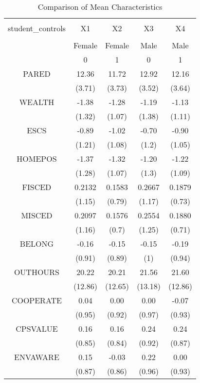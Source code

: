 
\begin{table}[!htbp] \centering 
  \caption{Comparison of Mean Characteristics} 
  \label{Tab1} 
\scriptsize 
\begin{tabular}{@{\extracolsep{5pt}} ccccc} 
\\[-1.8ex]\hline 
\hline \\[-1.8ex] 
student\_controls & X1 & X2 & X3 & X4 \\ 
\hline \\[-1.8ex] 
 & Female & Female & Male & Male \\ 
 & 0 & 1 & 0 & 1 \\ 
PARED & 12.36 & 11.72 & 12.92 & 12.16 \\ 
 & (3.71) & (3.73) & (3.52) & (3.64) \\ 
WEALTH & -1.38 & -1.28 & -1.19 & -1.13 \\ 
 & (1.32) & (1.07) & (1.38) & (1.11) \\ 
ESCS & -0.89 & -1.02 & -0.70 & -0.90 \\ 
 & (1.21) & (1.08) & (1.2) & (1.05) \\ 
HOMEPOS & -1.37 & -1.32 & -1.20 & -1.22 \\ 
 & (1.28) & (1.07) & (1.3) & (1.09) \\ 
FISCED & 0.2132 & 0.1583 & 0.2667 & 0.1879 \\ 
 & (1.15) & (0.79) & (1.17) & (0.73) \\ 
MISCED & 0.2097 & 0.1576 & 0.2554 & 0.1880 \\ 
 & (1.16) & (0.7) & (1.25) & (0.71) \\ 
BELONG & -0.16 & -0.15 & -0.15 & -0.19 \\ 
 & (0.91) & (0.89) & (1) & (0.94) \\ 
OUTHOURS & 20.22 & 20.21 & 21.56 & 21.60 \\ 
 & (12.86) & (12.65) & (13.18) & (12.86) \\ 
COOPERATE &  0.04 &  0.00 &  0.00 & -0.07 \\ 
 & (0.95) & (0.92) & (0.97) & (0.93) \\ 
CPSVALUE & 0.16 & 0.16 & 0.24 & 0.24 \\ 
 & (0.85) & (0.84) & (0.92) & (0.87) \\ 
ENVAWARE &  0.15 & -0.03 &  0.22 &  0.00 \\ 
 & (0.87) & (0.86) & (0.96) & (0.93) \\ 

\end{tabular}
\end{table}
